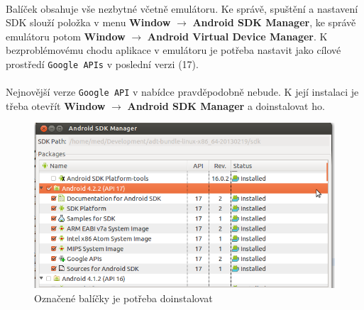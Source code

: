 \paragraph{}
Balíček obsahuje vše nezbytné včetně emulátoru. Ke správě, spuštění a nastavení SDK slouží položka v menu \textbf{Window} $\rightarrow$ \textbf{Android SDK Manager}, ke správě emulátoru potom \textbf{Window} $\rightarrow$ \textbf{Android Virtual Device Manager}. K bezproblémovému chodu aplikace v emulátoru je potřeba nastavit jako cílové prostředí \texttt{Google APIs} v poslední verzi (17).
\paragraph{}
Nejnovější verze \texttt{Google API} v nabídce pravděpodobně nebude. K její instalaci je třeba otevřít \textbf{Window} $\rightarrow$ \textbf{Android SDK Manager} a doinstalovat ho. 
\begin{figure}[hb]
\begin{center}
\includegraphics[scale=0.5]{pics/SDK_manager.png}
\caption{Označené balíčky je potřeba doinstalovat}
\end{center}
\end{figure}
